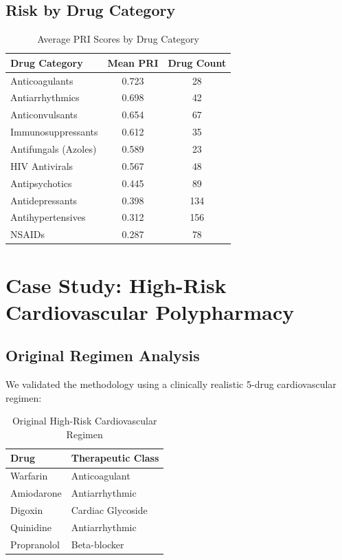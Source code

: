 \documentclass[11pt,a4paper]{article}
\begin{document}
\subsection{Risk by Drug Category}

\begin{table}[H]
\centering
\caption{Average PRI Scores by Drug Category}
\label{tab:category_pri}
\begin{tabular}{lcc}
\toprule
\textbf{Drug Category} & \textbf{Mean PRI} & \textbf{Drug Count} \\
\midrule
Anticoagulants & 0.723 & 28 \\
Antiarrhythmics & 0.698 & 42 \\
Anticonvulsants & 0.654 & 67 \\
Immunosuppressants & 0.612 & 35 \\
Antifungals (Azoles) & 0.589 & 23 \\
HIV Antivirals & 0.567 & 48 \\
Antipsychotics & 0.445 & 89 \\
Antidepressants & 0.398 & 134 \\
Antihypertensives & 0.312 & 156 \\
NSAIDs & 0.287 & 78 \\
\bottomrule
\end{tabular}
\end{table}

\section{Case Study: High-Risk Cardiovascular Polypharmacy}

\subsection{Original Regimen Analysis}

We validated the methodology using a clinically realistic 5-drug cardiovascular regimen:

\begin{table}[H]
\centering
\caption{Original High-Risk Cardiovascular Regimen}
\label{tab:original_regimen}
\begin{tabular}{ll}
\toprule
\textbf{Drug} & \textbf{Therapeutic Class} \\
\midrule
Warfarin & Anticoagulant \\
Amiodarone & Antiarrhythmic \\
Digoxin & Cardiac Glycoside \\
Quinidine & Antiarrhythmic \\
Propranolol & Beta-blocker \\
\bottomrule
\end{tabular}
\end{table}
\end{document}

